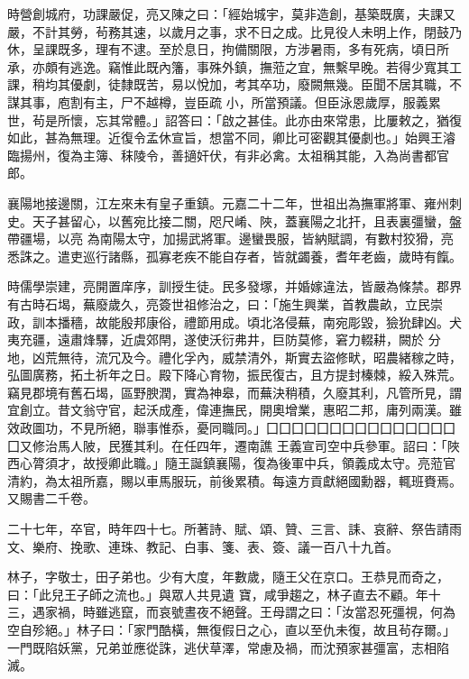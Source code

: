\begin{pinyinscope}
 時營創城府，功課嚴促，亮又陳之曰：「經始城宇，莫非造創，基築既廣，夫課又嚴，不計其勞，茍務其速，以歲月之事，求不日之成。比見役人未明上作，閉鼓乃休，呈課既多，理有不逮。至於息日，拘備關限，方涉暑雨，多有死病，頃日所承，亦頗有逃逸。竊惟此既內籓，事殊外鎮，撫蒞之宜，無繫早晚。若得少寬其工課，稍均其優劇，徒隸既苦，易以悅加，考其卒功，廢闕無幾。臣聞不居其職，不謀其事，庖割有主，尸不越樽，豈臣疏
 小，所當預議。但臣泳恩歲厚，服義累世，茍是所懷，忘其常體。」詔答曰：「啟之甚佳。此亦由來常患，比屢敕之，猶復如此，甚為無理。近復令孟休宣旨，想當不同，卿比可密觀其優劇也。」始興王濬臨揚州，復為主簿、秣陵令，善擿奸伏，有非必禽。太祖稱其能，入為尚書都官郎。



 襄陽地接邊關，江左來未有皇子重鎮。元嘉二十二年，世祖出為撫軍將軍、雍州刺史。天子甚留心，以舊宛比接二關，咫尺崤、陜，蓋襄陽之北扞，且表裏彊蠻，盤帶疆場，以亮
 為南陽太守，加揚武將軍。邊蠻畏服，皆納賦調，有數村狡猾，亮悉誅之。遣吏巡行諸縣，孤寡老疾不能自存者，皆就蠲養，耆年老齒，歲時有餼。



 時儒學崇建，亮開置庠序，訓授生徒。民多發塚，并婚嫁違法，皆嚴為條禁。郡界有古時石堨，蕪廢歲久，亮簽世祖修治之，曰：「施生興業，首教農畝，立民崇政，訓本播穡，故能殷邦康俗，禮節用成。頃北洛侵蕪，南宛彫毀，獫狁肆凶。犬夷充疆，遠肅烽驛，近虞郊閈，遂使沃衍弗井，巨防莫修，窘力輟耕，闕於
 分地，凶荒無待，流冗及今。禮化孚內，威禁清外，斯實去盜修畎，昭農緒稼之時，弘圖廣務，拓土祈年之日。殿下降心育物，振民復古，且方提封榛棘，綏入殊荒。竊見郡境有舊石堨，區野腴潤，實為神皋，而蕪決稍積，久廢其利，凡管所見，謂宜創立。昔文翁守官，起沃成產，偉連撫民，開奧增業，惠昭二邦，庸列兩漢。雖效政圖功，不見所絕，聯事惟忝，憂同職同。」囗囗囗囗囗囗囗囗囗囗囗囗囗囗囗囗又修治馬人陂，民獲其利。在任四年，遷南譙
 王義宣司空中兵參軍。詔曰：「陜西心膂須才，故授卿此職。」隨王誕鎮襄陽，復為後軍中兵，領義成太守。亮蒞官清約，為太祖所嘉，賜以車馬服玩，前後累積。每遠方貢獻絕國勳器，輒班賚焉。又賜書二千卷。



 二十七年，卒官，時年四十七。所著詩、賦、頌、贊、三言、誄、哀辭、祭告請雨文、樂府、挽歌、連珠、教記、白事、箋、表、簽、議一百八十九首。



 林子，字敬士，田子弟也。少有大度，年數歲，隨王父在京口。王恭見而奇之，曰：「此兒王子師之流也。」與眾人共見遺
 寶，咸爭趨之，林子直去不顧。年十三，遇家禍，時雖逃竄，而哀號晝夜不絕聲。王母謂之曰：「汝當忍死彊視，何為空自殄絕。」林子曰：「家門酷橫，無復假日之心，直以至仇未復，故且茍存爾。」一門既陷妖黨，兄弟並應從誅，逃伏草澤，常慮及禍，而沈預家甚彊富，志相陷滅。




\end{pinyinscope}
